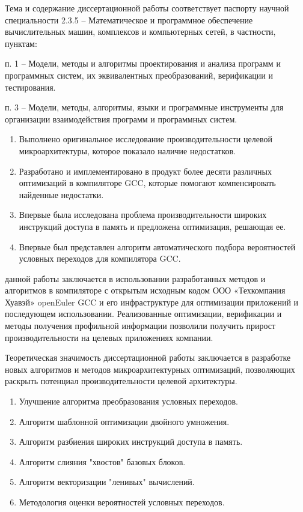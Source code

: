 Тема и содержание диссертационной работы соответствует паспорту научной
специальности 2.3.5 – Математическое и программное обеспечение вычислительных машин, комплексов и компьютерных сетей, в частности, пунктам:

п. 1 – Модели, методы и алгоритмы проектирования и анализа программ
и программных систем, их эквивалентных преобразований, верификации и тестирования.

п. 3 – Модели, методы, алгоритмы, языки и программные инструменты
для организации взаимодействия программ и программных систем.

{\novelty}
\begin{enumerate}[beginpenalty=10000] %
  \item Выполнено оригинальное исследование производительности целевой микроархитектуры, которое показало наличие недостатков.
  \item Разработано и имплементировано в продукт более десяти различных оптимизаций в компиляторе GCC, которые помогают компенсировать найденные недостатки.
  \item Впервые была исследована проблема производительности широких инструкций доступа в память и предложена оптимизация, решающая ее. 
  \item Впервые был представлен алгоритм автоматического подбора вероятностей условных переходов для компилятора GCC.
\end{enumerate}

{\influence}  данной работы заключается в использовании
разработанных методов и алгоритмов в  компиляторе с открытым исходным кодом  ООО «Техкомпания Хуавэй»  openEuler GCC и его
инфраструктуре для оптимизации приложений и последующем использовании. Реализованные оптимизации, верификации
и методы получения профильной информации позволили получить прирост производительности
на целевых приложениях компании.

Теоретическая значимость диссертационной работы заключается в разработке
новых алгоритмов и методов микроархитектурных оптимизаций, позволяющих раскрыть потенциал производительности целевой архитектуры.


{}
\begin{enumerate}[beginpenalty=10000] %
  \item Улучшение алгоритма преобразования условных переходов.
  \item Алгоритм шаблонной оптимизации двойного умножения.
  \item Алгоритм разбиения широких инструкций доступа в память.
  \item Алгоритм слияния "хвостов"\phantom{ } базовых блоков.
  \item Алгоритм векторизации "ленивых"\phantom{ } вычислений.
  \item Методология оценки вероятностей условных переходов.
\end{enumerate}

